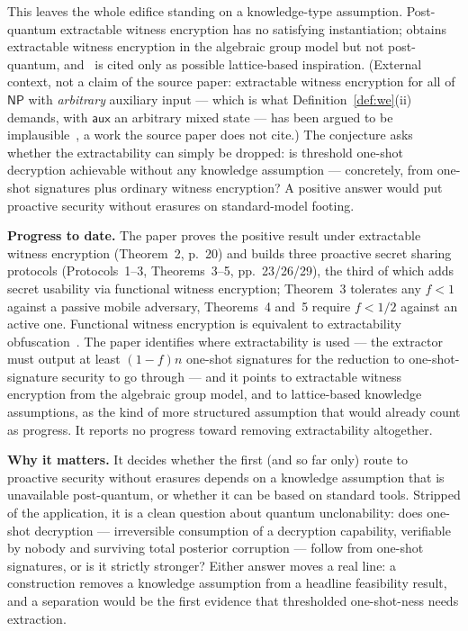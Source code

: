 \documentclass{conjura-conjecture}
\newcommand{\NP}{\mathsf{NP}}
\newcommand{\aux}{\mathsf{aux}}
\begin{document}
This leaves the whole edifice standing on a knowledge-type assumption.
Post-quantum extractable witness encryption has no satisfying
instantiation; \cite{FHAS24} obtains extractable witness encryption in
the algebraic group model but not post-quantum, and~\cite{ACL+22} is
cited only as possible lattice-based inspiration. (External context,
not a claim of the source paper: extractable witness encryption for
all of $\NP$ with \emph{arbitrary} auxiliary input --- which is what
Definition~\ref{def:we}(ii) demands, with $\aux$ an arbitrary mixed
state --- has been argued to be implausible~\cite{GGHW14}, a work the
source paper does not cite.) The conjecture asks whether the
extractability can simply be dropped: is threshold one-shot decryption
achievable without any knowledge assumption --- concretely, from
one-shot signatures plus ordinary witness encryption? A positive
answer would put proactive security without erasures on standard-model
footing.

\textbf{Progress to date.} The paper proves the positive result under
extractable witness encryption (Theorem~2, p.~20) and builds three
proactive secret sharing protocols (Protocols~1--3, Theorems~3--5,
pp.~23/26/29), the third of which adds secret usability via functional
witness encryption; Theorem~3 tolerates any $f < 1$ against a passive
mobile adversary, Theorems~4 and~5 require $f < 1/2$ against an active
one. Functional witness encryption is equivalent to extractability
obfuscation~\cite{BCP14}. The paper identifies where extractability is
used --- the extractor must output at least $(1-f)n$ one-shot
signatures for the reduction to one-shot-signature security to go
through --- and it points to extractable witness encryption from the
algebraic group model, and to lattice-based knowledge assumptions, as
the kind of more structured assumption that would already count as
progress. It reports no progress toward removing extractability
altogether.

\textbf{Why it matters.} It decides whether the first (and so far
only) route to proactive security without erasures depends on a
knowledge assumption that is unavailable post-quantum, or whether it
can be based on standard tools. Stripped of the application, it is a
clean question about quantum unclonability: does one-shot decryption
--- irreversible consumption of a decryption capability, verifiable by
nobody and surviving total posterior corruption --- follow from
one-shot signatures, or is it strictly stronger? Either answer moves a
real line: a construction removes a knowledge assumption from a
headline feasibility result, and a separation would be the first
evidence that thresholded one-shot-ness needs extraction.
\end{document}
